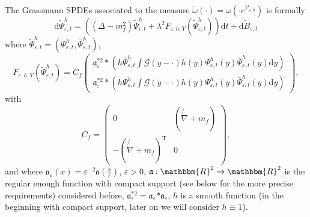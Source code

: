 \documentclass[11pt]{article}
\newcommand{\Tau}{\mathrm{T}}
\newcommand{\asterisk}{\mathord{*}}
\newcommand{\mathd}{\mathrm{d}}
\begin{document}
The Grassmann SPDEs associated to the measure $\tilde{\omega} (\cdot) = \omega
(\cdot e^{\mathcal{V}_{\varepsilon, h}})$ is formally
\begin{equation}
  \mathd \tilde{\Psi}_{\varepsilon, t}^h = ((\Delta - m_f^2)
  \tilde{\Psi}_{\epsilon, t}^h + \lambda^2 F_{\varepsilon, h, Y}
  (\tilde{\Psi}_{\varepsilon, t}^h)) \mathd t + \mathd \tilde{B}_{\varepsilon,
  t} \label{eq:stochasticquantization}
\end{equation}
where $\tilde{\Psi}_{\varepsilon, t}^h = (\Psi_{\varepsilon, t}^h,
\bar{\Psi}_{\varepsilon, t}^h)$,
\[ F_{\varepsilon, h, Y} (\tilde{\Psi}_{\varepsilon, t}^h) = C_f \left(
   \begin{array}{l}
     \mathfrak{a}_{\varepsilon}^{\asterisk 2} \ast \left( h
     \bar{\Psi}_{\varepsilon, t}^h \int \mathcal{G} (y - \cdot) h (y)
     \Psi_{\varepsilon, t}^h (y) \bar{\Psi}_{\varepsilon, t}^h (y) \mathd y
     \right)\\
     \mathfrak{a}_{\varepsilon}^{\asterisk 2} \ast \left( h \Psi_{\varepsilon,
     t}^h \int \mathcal{G} (y - \cdot) h (y) \Psi_{\varepsilon, t}^h (y)
     \bar{\Psi}_{\varepsilon, t}^h (y) \mathd y \right)
   \end{array} \right), \]
with
\begin{equation}
  C_f = \left(\begin{array}{cc}
    0 & \left( \not{\nabla} + m_f \right)\\
    - \left( \not{\nabla} + m_f \right)^{\Tau} & 0
  \end{array}\right), \label{eq:Cf}
\end{equation}
and where $\mathfrak{a}_{\varepsilon} (x) = \varepsilon^{- 2} \mathfrak{a}
\left( \frac{x}{\varepsilon} \right)$, $\varepsilon > 0$, $\mathfrak{a} :
\mathbbm{R}^2 \rightarrow \mathbbm{R}^2$ is the regular enough function with
compact support (see below for the more precise requirements) considered
before, $\mathfrak{a}_{\varepsilon}^{\asterisk 2} = \mathfrak{a}_{\varepsilon}
\asterisk \mathfrak{a}_{\varepsilon}$, $h$ is a smooth function (in the
beginning with compact support, later on we will consider $h \equiv 1$).
\end{document}
